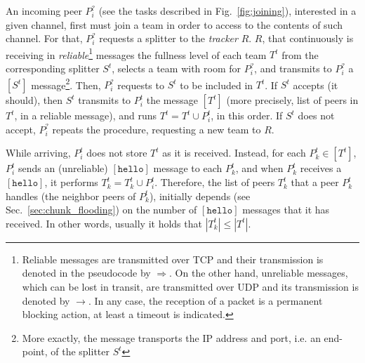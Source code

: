 
\label{sec:peer_joining}
\begin{figure*}
   \caption{Tasks involved in a peer
    joining. $P^t_i$ is the incoming peer, and $P^t_k$ is a peer that
    is already in the team. $R$ represents the tracker, and $S^t$ the
    splitter of the team $T^t$ to which $P^t_k$ belongs, and $P^t_i$
    will be added.\label{fig:joining}}
\end{figure*}
An incoming peer $P^?_i$ (see the tasks described in
Fig.~\ref{fig:joining}), interested in a given channel, first must
join a team in order to access to the contents of such channel. For
that, $P^?_i$ requests a splitter to the \emph{tracker} $R$. $R$, that
continuously is receiving in \emph{reliable}\footnote{Reliable
  messages are transmitted over TCP and their transmission is denoted
  in the pseudocode by $\Rightarrow$. On the other hand, unreliable
  messages, which can be lost in transit, are transmitted over UDP and
  its transmission is denoted by $\rightarrow$. In any case, the
  reception of a packet is a permanent blocking action, at least a
  timeout is indicated.}  messages the fullness level of each team
$T^t$ from the corresponding splitter $S^t$, selects a team with room
for $P^?_i$, and transmits to $P^?_i$ a $[S^t]$ message\footnote{More
  exactly, the message transports the IP address and port, i.e. an
  end-point, of the splitter $S^t$}. Then, $P^?_i$ requests to $S^t$
to be included in $T^t$. If $S^t$ accepts (it should), then $S^t$
transmits to $P^t_i$ the message $[T^t]$ (more precisely, list of
peers in $T^t$, in a reliable message), and runs $T^t = T^t \cup
P^t_i$, in this order. If $S^t$ does not accept, $P^?_i$ repeats the
procedure, requesting a new team to $R$.


While arriving, $P^t_i$ does not store $T^t$ as it is
received. Instead, for each $P^t_k\in [T^t]$, $P^t_i$ sends an
(unreliable) $[\mathtt{hello}]$ message to each $P^t_k$, and when
$P^t_k$ receives a $[\mathtt{hello}]$, it performs $T^t_k = T^t_k \cup
P^t_i$. Therefore, the list of peers $T^t_k$ that a peer $P^t_k$
handles (the neighbor peers of $P^t_k$), initially depends (see
Sec.~\ref{sec:chunk_flooding}) on the number of $[\mathtt{hello}]$
messages that it has received. In other words, usually it holds that
$|T^t_k| \le |T^t|$.

